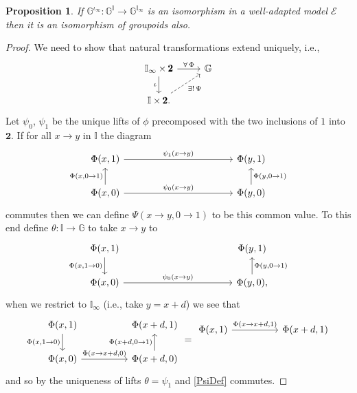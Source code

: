 \documentclass[10pt,a4paper]{amsart}
\numberwithin{equation}{section}
\newtheorem{Proposition}[Theorem]{Proposition}
{ \theoremstyle{definition}
\newtheorem{Definition}[Theorem]{Definition}
\newtheorem{Notation}[Theorem]{Notation}
\newtheorem{Example}[Theorem]{Example}
\newtheorem{Remark}[Theorem]{Remark} }
\begin{document}
\begin{Proposition}\label{prop:groupoid-enriched-integration}
If $\mathbb{G}^{\iota_{\infty}}\colon \mathbb{G}^{\mathbb{I}}\rightarrow\mathbb{G}^{\mathbb{I}_{\infty}}$ is an isomorphism in a well-adapted model $\mathcal{E}$ then it is an isomorphism of groupoids also.
\end{Proposition}
\begin{proof}
We need to show that natural transformations extend uniquely, i.e.,
\begin{equation*}\begin{tikzcd}
\mathbb{I}_{\infty}\times\pmb{2} \rar{\forall\,\Phi} \dar[swap]{\iota} & \mathbb{G} \\
\mathbb{I}\times\pmb{2}. \urar[dashed][swap]{\exists!\,\Psi} &
\end{tikzcd}
\end{equation*}
Let $\psi_{0}$, $\psi_{1}$ be the unique lifts of $\phi$ precomposed with the two inclusions of $1$ into $\pmb{2}$. If for all $x\rightarrow y$ in $\mathbb{I}$ the diagram
\begin{equation}\label{PsiDef}
	\begin{tikzcd}[column sep=4cm]
\Phi(x,1) \rar{\psi_{1}(x\rightarrow y)} \dar[leftarrow,swap]{\Phi(x,0\rightarrow 1)} & \Phi(y,1) \dar[leftarrow]{\Phi(y,0\rightarrow 1)} \\
\Phi(x,0) \rar{\psi_{0}(x\rightarrow y)} & \Phi(y,0)
\end{tikzcd}
\end{equation}
commutes then we can def\/ine $\Psi(x\rightarrow y,0\rightarrow 1)$ to be this common value. To this end def\/ine $\theta\colon \mathbb{I}\rightarrow \mathbb{G}$ to take $x\rightarrow y$ to
\begin{equation*}\begin{tikzcd}[column sep=4cm]
\Phi(x,1) \dar[swap]{\Phi(x,1\rightarrow 0)} & \Phi(y,1) \dar[leftarrow]{\Phi(y,0\rightarrow 1)} \\
\Phi(x,0) \rar{\psi_{0}(x\rightarrow y)} & \Phi(y,0),
\end{tikzcd}
\end{equation*}
when we restrict to $\mathbb{I}_{\infty}$ (i.e., take $y=x+d$) we see that
\begin{equation*}\begin{tikzcd}[column sep=1.7cm]
\Phi(x,1) \dar[swap]{\Phi(x,1\rightarrow 0)} & \Phi(x+d,1) \dar[swap,leftarrow]{\Phi(x+d,0\rightarrow 1)} \\
\Phi(x,0) \rar{\Phi(x\rightarrow x+d,0)} & \Phi(x+d,0)
\end{tikzcd}
=
\begin{tikzcd}[column sep=1.7cm]
\Phi(x,1) \rar{\Phi(x\rightarrow x+d,1)} & \Phi(x+d,1) \\
{} & {}
\end{tikzcd}
\end{equation*}
and so by the uniqueness of lifts $\theta=\psi_{1}$ and \eqref{PsiDef} commutes.
\end{proof}
\end{document}
